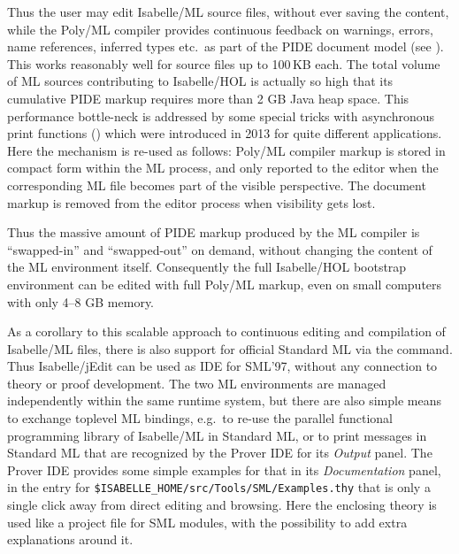 \begin{isabellebody}
\begin{isamarkuptext}
Thus the user may edit Isabelle/ML source files, without ever saving the
content, while the Poly/ML compiler provides continuous feedback on
warnings, errors, name references, inferred types etc.\ as part of the PIDE
document model (see ). This works reasonably well for source
files up to 100\,KB each. The total volume of ML sources contributing to
Isabelle/HOL is actually so high that its cumulative PIDE markup requires
more than 2 GB Java heap space. This performance bottle-neck is addressed by
some special tricks with asynchronous print functions
() which were introduced in 2013 for quite different
applications. Here the mechanism is re-used as follows: Poly/ML compiler
markup is stored in compact form within the ML process, and only reported to
the editor when the corresponding ML file becomes part of the visible
perspective. The document markup is removed from the editor process when
visibility gets lost.

Thus the massive amount of PIDE markup produced by the ML compiler is
``swapped-in'' and ``swapped-out'' on demand, without changing the content
of the ML environment itself. Consequently the full Isabelle/HOL bootstrap
environment can be edited with full Poly/ML markup, even on small computers
with only 4--8 GB memory.

\medskip As a corollary to this scalable approach to continuous editing and
compilation of Isabelle/ML files, there is also support for official
Standard ML via the \hyperlink{command.SML-file}{\mbox{}} command. Thus Isabelle/jEdit can be
used as IDE for SML'97, without any connection to theory or proof
development. The two ML environments are managed independently within the
same runtime system, but there are also simple means to exchange toplevel ML
bindings, e.g.\ to re-use the parallel functional programming library of
Isabelle/ML in Standard ML, or to print messages in Standard ML that are
recognized by the Prover IDE for its \emph{Output} panel. The Prover IDE
provides some simple examples for that in its \emph{Documentation} panel, in
the entry for \verb|$ISABELLE_HOME|\verb|/|\discretionary{}{}{}\verb|src|\verb|/|\discretionary{}{}{}\verb|Tools|\verb|/|\discretionary{}{}{}\verb|SML|\verb|/|\discretionary{}{}{}\verb|Examples.thy| that is
only a single click away from direct editing and browsing. Here the
enclosing theory is used like a project file for SML modules, with the
possibility to add extra explanations around it.


\end{isamarkuptext}
\end{isabellebody}
